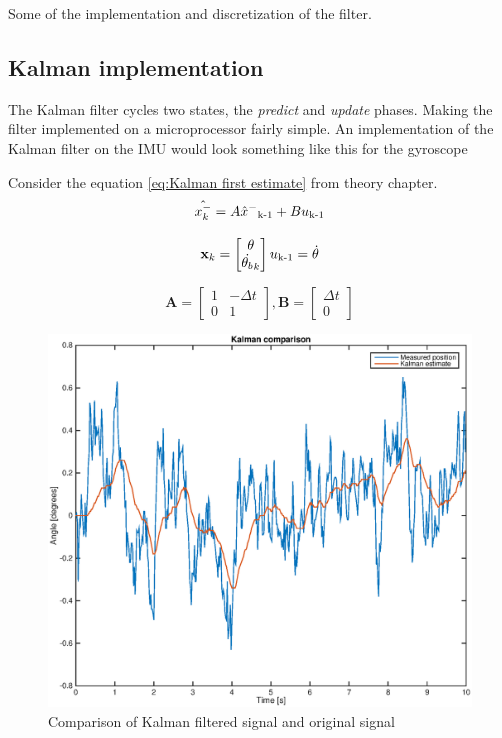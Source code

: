 \documentclass[a4paper,11pt]{kth-mag}
\begin{document}
Some of the implementation and discretization of the filter.
\subsection{Kalman implementation}
The Kalman filter cycles two states, the \textit{predict} and \textit{update} phases. Making the filter implemented on a microprocessor fairly simple. 
An implementation of the Kalman filter on the IMU would look something like this for the gyroscope

Consider the equation \eqref{eq:Kalman first estimate} from theory chapter.
\begin{equation}
\hat{x^-_k} = A\hat{x}^-\textsubscript{k-1}+Bu\textsubscript{k-1}
\end{equation}


\begin{equation}
\textbf{x}_k = \begin{bmatrix}
\theta \\
\dot{\theta_b}_k
\end{bmatrix}
u\textsubscript{k-1} = \dot{\theta}
\end{equation}

\begin{equation}
\textbf{A} = \begin{bmatrix}
1  & -\Delta t \\
0   & 1
\end{bmatrix}
,
\textbf{B} = \begin{bmatrix}
\Delta t \\ 0
\end{bmatrix}
\end{equation}



\begin{figure}[!htb]
\centering
\includegraphics[scale=.7]{Kalmancomparisonplot.eps}
\caption{Comparison of Kalman filtered signal and original signal}
\label{fig:Kalman comparison}
\end{figure}
\end{document}
